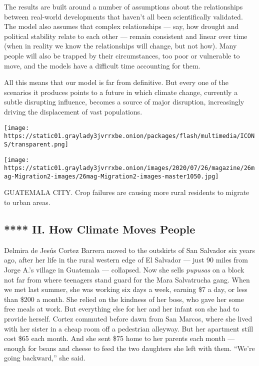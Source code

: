 The results are built around a number of assumptions about the
relationships between real-world developments that haven't all been
scientifically validated. The model also assumes that complex
relationships --- say, how drought and political stability relate to
each other --- remain consistent and linear over time (when in reality
we know the relationships will change, but not how). Many people will
also be trapped by their circumstances, too poor or vulnerable to move,
and the models have a difficult time accounting for them.

All this means that our model is far from definitive. But every one of
the scenarios it produces points to a future in which climate change,
currently a subtle disrupting influence, becomes a source of major
disruption, increasingly driving the displacement of vast populations.

\texttt{[image: https://static01.graylady3jvrrxbe.onion/packages/flash/multimedia/ICONS/transparent.png]}

\texttt{[image: https://static01.graylady3jvrrxbe.onion/images/2020/07/26/magazine/26mag-Migration2-images/26mag-Migration2-images-master1050.jpg]}

GUATEMALA CITY. Crop failures are causing more rural residents to
migrate to urban areas.

\hypertarget{--ii-how-climate-moves-people}{%
\subsection{ **** II. How Climate Moves
People}\label{--ii-how-climate-moves-people}}

Delmira de Jesús Cortez Barrera moved to the outskirts of San Salvador
six years ago, after her life in the rural western edge of El Salvador
--- just 90 miles from Jorge A.'s village in Guatemala --- collapsed.
Now she sells \emph{pupusas} on a block not far from where teenagers
stand guard for the Mara Salvatrucha gang. When we met last summer, she
was working six days a week, earning \$7 a day, or less than \$200 a
month. She relied on the kindness of her boss, who gave her some free
meals at work. But everything else for her and her infant son she had to
provide herself. Cortez commuted before dawn from San Marcos, where she
lived with her sister in a cheap room off a pedestrian alleyway. But her
apartment still cost \$65 each month. And she sent \$75 home to her
parents each month --- enough for beans and cheese to feed the two
daughters she left with them. ``We're going backward,'' she said.

